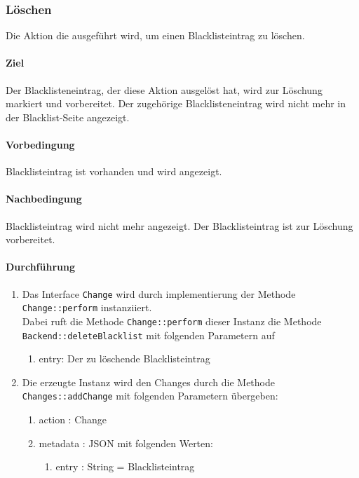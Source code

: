 \subsubsection{Löschen}

Die Aktion die ausgeführt wird, um einen Blacklisteintrag zu löschen.

\paragraph*{Ziel}
Der Blacklisteneintrag, der diese Aktion ausgelöst hat, wird zur Löschung markiert und vorbereitet.
Der zugehörige Blacklisteneintrag wird nicht mehr in der Blacklist-Seite angezeigt.

\paragraph*{Vorbedingung}
Blacklisteintrag ist vorhanden und wird angezeigt.

\paragraph*{Nachbedingung}
Blacklisteintrag wird nicht mehr angezeigt. Der Blacklisteintrag ist zur Löschung vorbereitet.

\paragraph*{Durchführung}
\begin{enumerate}
    \item Das Interface \verb#Change# wird durch implementierung der Methode \verb#Change::perform# instanziiert. \\
          Dabei ruft die Methode \verb#Change::perform# dieser Instanz die Methode \verb#Backend::deleteBlacklist# mit folgenden Parametern auf \begin{enumerate}
              \item entry: Der zu löschende Blacklisteintrag
          \end{enumerate}
    \item Die erzeugte Instanz wird den Changes durch die Methode \verb#Changes::addChange# mit folgenden Parametern übergeben: \begin{enumerate}
        \item action : Change
        \item metadata : JSON mit folgenden Werten: \begin{enumerate}
            \item entry : String = Blacklisteintrag
        \end{enumerate}
    \end{enumerate}
\end{enumerate}